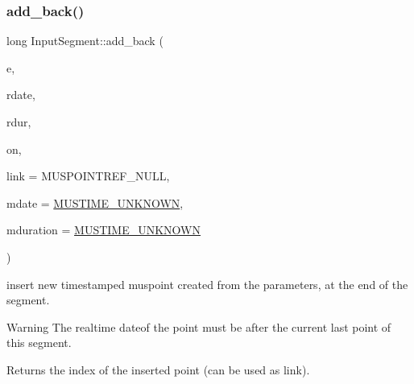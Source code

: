 \subsubsection{\texorpdfstring{add\_back()}{add\_back()}}
{\footnotesize\ttfamily long Input\+Segment\+::add\+\_\+back (\begin{DoxyParamCaption}\item[{\mbox{\hyperlink{classMusEvent}{Mus\+Event}} $\ast$}]{e,  }\item[{double}]{rdate,  }\item[{double}]{rdur,  }\item[{bool}]{on,  }\item[{long}]{link = {\ttfamily MUSPOINTREF\+\_\+NULL},  }\item[{\mbox{\hyperlink{classRational}{Rational}}}]{mdate = {\ttfamily \mbox{\hyperlink{group__general_gae862a9d955eb3154601efb64980ac24b}{M\+U\+S\+T\+I\+M\+E\+\_\+\+U\+N\+K\+N\+O\+WN}}},  }\item[{\mbox{\hyperlink{classRational}{Rational}}}]{mduration = {\ttfamily \mbox{\hyperlink{group__general_gae862a9d955eb3154601efb64980ac24b}{M\+U\+S\+T\+I\+M\+E\+\_\+\+U\+N\+K\+N\+O\+WN}}} }\end{DoxyParamCaption})}



insert new timestamped muspoint created from the parameters, at the end of the segment. 

\begin{DoxyWarning}{Warning}
The realtime dateof the point must be after the current last point of this segment. 
\end{DoxyWarning}
\begin{DoxyReturn}{Returns}
the index of the inserted point (can be used as link). 
\end{DoxyReturn}
\mbox{\label{group__segment_gad44eb7379e181fc4295ee2514a568204}} 
